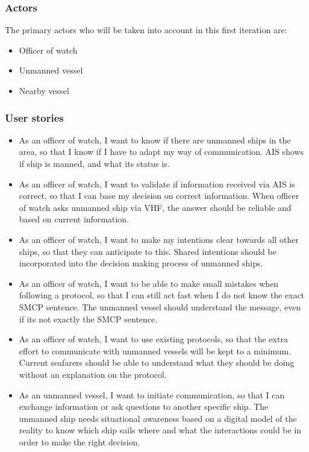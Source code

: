 \subsubsection{Actors}
The primary actors who will be taken into account in this first iteration are:
\begin{itemize}
	\item Officer of watch
	\item Unmanned vessel
	\item Nearby vessel
\end{itemize}

\subsubsection{User stories}
\begin{itemize}
	\item As an officer of watch, I want to know if there are unmanned ships in the area, so that I know if I have to adapt my way of communication. \ac{AIS} shows if ship is manned, and what its status is.
	
	\item As an officer of watch, I want to validate if information received via \ac{AIS} is correct, so that I can base my decision on correct information. When officer of watch asks unmanned ship via \ac{VHF}, the answer should be reliable and based on current information.
	
	\item As an officer of watch, I want to make my intentions clear towards all other ships, so that they can anticipate to this. Shared intentions should be incorporated into the decision making process of unmanned ships.
	
	\item As an officer of watch, I want to be able to make small mistakes when following a protocol, so that I can still act fast when I do not know the exact \ac{SMCP} sentence. The unmanned vessel should understand the message, even if its not exactly the \ac{SMCP} sentence.
	
	\item As an officer of watch, I want to use existing protocols, so that the extra effort to communicate with unmanned vessels will be kept to a minimum. Current seafarers should be able to understand what they should be doing without an explanation on the protocol. 
	
	\item As an unmanned vessel, I want to initiate communication, so that I can exchange information or ask questions to another specific ship. The unmanned ship needs situational awareness based on a digital model of the reality to know which ship sails where and what the interactions could be in order to make the right decision.
	

\end{itemize}
